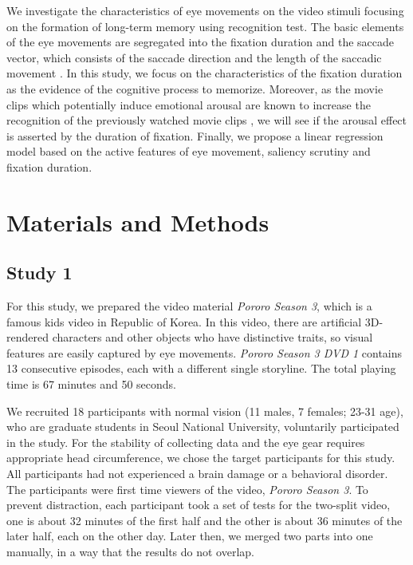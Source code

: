 \documentclass[oneside,master]{snueethesis}
\begin{document}
We investigate the characteristics of eye movements on the video stimuli focusing on the formation of long-term memory using recognition test. The basic elements of the eye movements are segregated into the fixation duration and the saccade vector, which consists of the saccade direction and the length of the saccadic movement \cite{Findlay1999,Feng2006}. In this study, we focus on the characteristics of the fixation duration as the evidence of the cognitive process to memorize. Moreover, as the movie clips which potentially induce emotional arousal are known to increase the recognition of the previously watched movie clips \cite{Cahill1996amyg,Cahill1998baso}, we will see if the arousal effect is asserted by the duration of fixation. Finally, we propose a linear regression model based on the active features of eye movement, saliency scrutiny and fixation duration.



\chapter{Materials and Methods}
\label{sec:material-and-methods}


\section{Study 1}

For this study, we prepared the video material \textit{Pororo Season 3}, which is a famous kids video in Republic of Korea. In this video, there are artificial 3D-rendered characters and other objects who have distinctive traits, so visual features are easily captured by eye movements. \textit{Pororo Season 3 DVD 1} contains 13 consecutive episodes, each with a different single storyline. The total playing time is 67 minutes and 50 seconds.

We recruited 18 participants with normal vision (11 males, 7 females; 23-31 age), who are graduate students in Seoul National University, voluntarily participated in the study. For the stability of collecting data and the eye gear requires appropriate head circumference, we chose the target participants for this study. All participants had not experienced a brain damage or a behavioral disorder. The participants were first time viewers of the video, \textit{Pororo Season 3}. To prevent distraction, each participant took a set of tests for the two-split video, one is about 32 minutes of the first half and the other is about 36 minutes of the later half, each on the other day. Later then, we merged two parts into one manually, in a way that the results do not overlap. 
\end{document}

